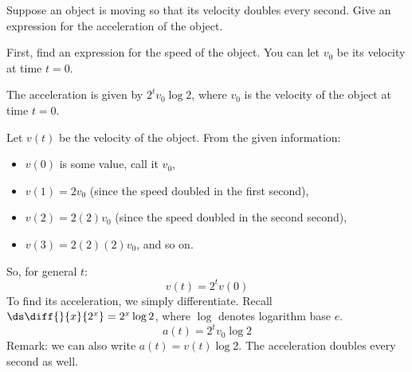 \begin{question}
Suppose an object is moving so that its velocity doubles every second. Give an expression for the acceleration of the object.
\end{question}
\begin{hint}
First, find an expression for the speed of the object. You can let $v_0$ be its velocity at time $t=0$.
\end{hint}
\begin{answer}
The acceleration is given by $2^tv_0\log 2$, where $v_0$ is the velocity of the object at time $t=0$.
\end{answer}
\begin{solution}
Let $v(t)$ be the velocity of the object. From the given information:
\begin{itemize}
\item $v(0)$ is some value, call it $v_0$,
\item $v(1)=2v_0$ (since the speed doubled in the first second),
\item $v(2)=2(2)v_0$ (since the speed doubled in the second second),
\item $v(3)=2(2)(2)v_0$, and so on.
\end{itemize} So, for general $t$:
\[v(t)=2^tv(0)\]
To find its acceleration, we simply differentiate. Recall $\ds\diff{}{x}\{2^x\}=2^x\log 2$, where $\log$ denotes logarithm base $e$.
\[a(t)=2^tv_0\log 2\]
Remark: we can also write $a(t)=v(t)\log 2$. The acceleration doubles every second as well.
\end{solution}



